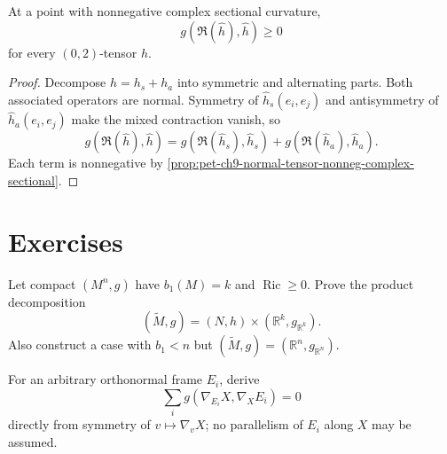 \begin{proposition}
  \label{prop:pet-ch9-general-tensor-nonneg-complex-sectional}

  At a point with nonnegative complex sectional curvature,
  \[
    g(\mathfrak R(\hat h),\hat h)\ge0
  \]
  for every $(0,2)$-tensor $h$.
\end{proposition}
\begin{proof}
  \sketch
  Decompose \(h=h_s+h_a\) into symmetric and alternating parts.  Both
  associated operators are normal.  Symmetry of \(\hat h_s(e_i,e_j)\) and
  antisymmetry of \(\hat h_a(e_i,e_j)\) make the mixed contraction vanish, so
  \[
    g(\mathfrak R(\hat h),\hat h)
      =g(\mathfrak R(\hat h_s),\hat h_s)
       +g(\mathfrak R(\hat h_a),\hat h_a).
  \]
  Each term is nonnegative by
  \cref{prop:pet-ch9-normal-tensor-nonneg-complex-sectional}.
\end{proof}

\section{Exercises}

\begin{remark}
  \label{rem:pet-ch9-exercise-9-6-1}

  Let compact $(M^n,g)$ have $b_1(M)=k$ and $\operatorname{Ric}\ge0$.  Prove
  the product decomposition
  \[
    (\widetilde M,g)=(N,h)\times(\mathbb R^k,g_{\mathbb R^k}).
  \]
  Also construct a case with $b_1<n$ but
  $(\widetilde M,g)=(\mathbb R^n,g_{\mathbb R^n})$.
\end{remark}

\begin{remark}
  \label{rem:pet-ch9-exercise-9-6-2}

  For an arbitrary orthonormal frame $E_i$, derive
  \[
    \sum_i g(\nabla_{E_i}X,\nabla_XE_i)=0
  \]
  directly from symmetry of $v\mapsto\nabla_vX$; no parallelism of $E_i$
  along $X$ may be assumed.
\end{remark}

